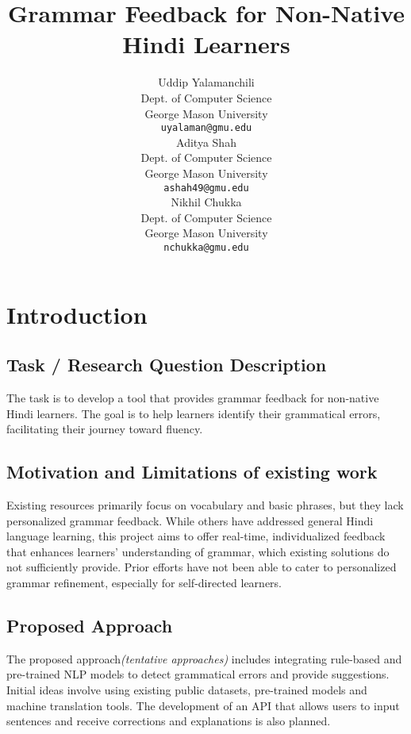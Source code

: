 \documentclass[11pt,a4paper]{article}
\title{Grammar Feedback for Non-Native Hindi Learners}
\author{Uddip Yalamanchili \\
  Dept. of Computer Science\\
  George Mason University \\
  \texttt{uyalaman@gmu.edu} \\\And
  Aditya Shah \\
  Dept. of Computer Science\\
  George Mason University \\
  \texttt{ashah49@gmu.edu} \\\And
  Nikhil Chukka\\
  Dept. of Computer Science\\
  George Mason University \\
  \texttt{nchukka@gmu.edu} \\}
\date{}
\begin{document}
\maketitle

\section{Introduction}

\subsection{Task / Research Question Description}

The task is to develop a tool that provides 
grammar feedback for non-native Hindi learners. The goal is to help learners identify 
their grammatical errors, facilitating their journey toward fluency.

\subsection{ Motivation and Limitations of existing work}

Existing resources primarily focus on vocabulary and basic phrases, but they lack personalized grammar feedback. While others have addressed general Hindi language learning, this project aims to offer real-time, individualized feedback that enhances learners' understanding of grammar, which existing solutions do not sufficiently provide. Prior efforts have not been able to cater to personalized grammar refinement, especially for self-directed learners.

\subsection{Proposed Approach}

The proposed approach\textit{(tentative approaches)} includes integrating rule-based and pre-trained NLP models to detect grammatical errors and provide suggestions. Initial ideas involve using existing public datasets, pre-trained models %
and machine translation tools. The development of an API that allows users to input sentences and receive corrections and explanations is also planned.
\end{document}
